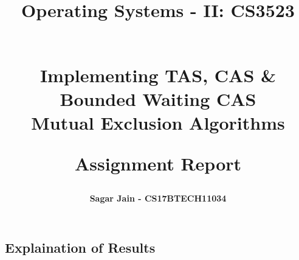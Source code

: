\documentclass[a4paper,12pt]{report}
\begin{document}
\title{
\textbf{Operating Systems - II: CS3523}\\~\\
\begin{large}
\textbf{Implementing TAS, CAS \& Bounded Waiting CAS\\
Mutual Exclusion Algorithms\\}
\end{large}
\begin{large}
\textbf{Assignment Report}
\end{large}
}
\author{\textbf{Sagar Jain - CS17BTECH11034}\\}
\maketitle
\begin{center}
\end{center}
\begin{center}
\end{center}
\subsection*{Explaination of Results}
\end{document}
